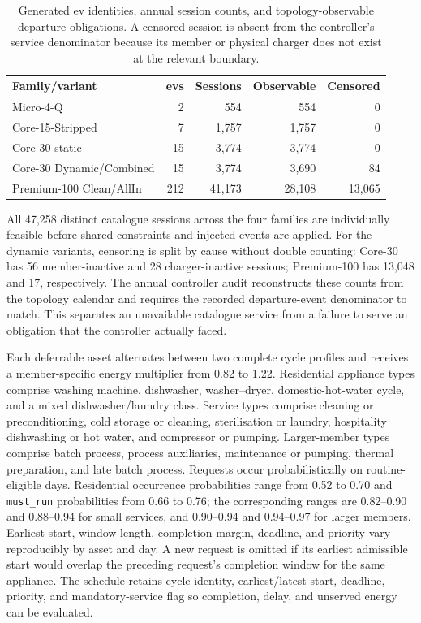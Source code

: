 \begin{table}[htbp]
\centering
\caption{Generated \gls{ev} identities, annual session counts, and topology-observable departure obligations. A censored session is absent from the controller's service denominator because its member or physical charger does not exist at the relevant boundary.}
\label{tab:app-suite-mobility-counts}
\footnotesize
\begin{tabular}{@{}lrrrr@{}}
\toprule
\textbf{Family/variant} & \textbf{\glspl{ev}} & \textbf{Sessions} & \textbf{Observable} & \textbf{Censored} \\
\midrule
Micro-4-Q & 2 & 554 & 554 & 0 \\
Core-15-Stripped & 7 & 1,757 & 1,757 & 0 \\
Core-30 static & 15 & 3,774 & 3,774 & 0 \\
Core-30 Dynamic/Combined & 15 & 3,774 & 3,690 & 84 \\
Premium-100 Clean/AllIn & 212 & 41,173 & 28,108 & 13,065 \\
\bottomrule
\end{tabular}
\end{table}

All 47,258 distinct catalogue sessions across the four families are individually feasible before shared constraints and injected events are applied. For the dynamic variants, censoring is split by cause without double counting: Core-30 has 56 member-inactive and 28 charger-inactive sessions; Premium-100 has 13,048 and 17, respectively. The annual controller audit reconstructs these counts from the topology calendar and requires the recorded departure-event denominator to match. This separates an unavailable catalogue service from a failure to serve an obligation that the controller actually faced.

Each deferrable asset alternates between two complete cycle profiles and receives a member-specific energy multiplier from 0.82 to 1.22. Residential appliance types comprise washing machine, dishwasher, washer--dryer, domestic-hot-water cycle, and a mixed dishwasher/laundry class. Service types comprise cleaning or preconditioning, cold storage or cleaning, sterilisation or laundry, hospitality dishwashing or hot water, and compressor or pumping. Larger-member types comprise batch process, process auxiliaries, maintenance or pumping, thermal preparation, and late batch process. Requests occur probabilistically on routine-eligible days. Residential occurrence probabilities range from 0.52 to 0.70 and \texttt{must\_run} probabilities from 0.66 to 0.76; the corresponding ranges are 0.82--0.90 and 0.88--0.94 for small services, and 0.90--0.94 and 0.94--0.97 for larger members. Earliest start, window length, completion margin, deadline, and priority vary reproducibly by asset and day. A new request is omitted if its earliest admissible start would overlap the preceding request's completion window for the same appliance. The schedule retains cycle identity, earliest/latest start, deadline, priority, and mandatory-service flag so completion, delay, and unserved energy can be evaluated.

